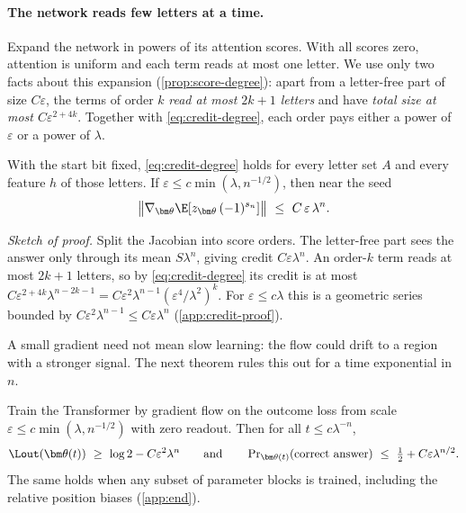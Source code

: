 \paragraph{The network reads few letters at a time.} Expand the network in powers of its attention scores.
With all scores zero, attention is uniform and each term reads at most one letter. We use only two facts
about this expansion (\cref{prop:score-degree}): apart from a letter-free part of size $C\varepsilon$, the terms of
order $k$ \emph{read at most $2k+1$ letters} and have \emph{total size at most $C\varepsilon^{2+4k}$}. Together with
\cref{eq:credit-degree}, each order pays either a power of $\varepsilon$ or a power of $\lambda$.

\begin{theorem}
\label{thm:main}
With the start bit fixed, \cref{eq:credit-degree} holds for every letter set $A$ and every feature $h$ of
those letters. If $\varepsilon\le c\min(\lambda,n^{-1/2})$, then near the seed
\[
 \bigl\|\nabla_{\bm\theta}\E[z_{\bm\theta}\,(-1)^{s_n}]\bigr\|\ \le\ C\,\varepsilon\,\lambda^{n}.
\]
\end{theorem}

\emph{Sketch of proof.} Split the Jacobian into score orders. The letter-free part sees the answer only
through its mean $S\lambda^n$, giving credit $C\varepsilon\lambda^n$. An order-$k$ term reads at most $2k+1$ letters,
so by \cref{eq:credit-degree} its credit is at most $C\varepsilon^{2+4k}\lambda^{n-2k-1}=C\varepsilon^2\lambda^{n-1}(\varepsilon^4/\lambda^2)^k$.
For $\varepsilon\le c\lambda$ this is a geometric series bounded by $C\varepsilon^2\lambda^{n-1}\le C\varepsilon\lambda^n$ (\cref{app:credit-proof}).

A small gradient need not mean slow learning: the flow could drift to a region with a stronger signal.
The next theorem rules this out for a time exponential in $n$.

\begin{theorem}
\label{thm:outcome-end}
Train the Transformer by gradient flow on the outcome loss from scale $\varepsilon\le c\min(\lambda,n^{-1/2})$ with zero
readout. Then for all $t\le c\lambda^{-n}$,
\[
 \Lout(\bm\theta(t))\ \ge\ \log2-C\varepsilon^2\lambda^n
 \qquad\text{and}\qquad
 \Pr\nolimits_{\bm\theta(t)}(\text{correct answer})\ \le\ \tfrac12+C\varepsilon\lambda^{n/2}.
\]
The same holds when any subset of parameter blocks is trained, including the relative position biases (\cref{app:end}).
\end{theorem}

